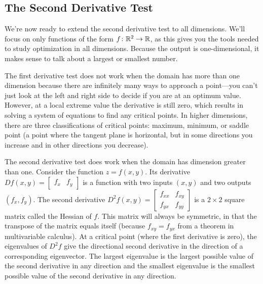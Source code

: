 \subsection{The Second Derivative Test}
We're now ready to extend the second derivative test to all dimensions. We'll focus on only functions of the form $f\colon{\ensuremath{\mathbb{R}}}^2\to{\ensuremath{\mathbb{R}}}$, as this gives you the tools needed to study optimization in all dimensions. Because the output is one-dimensional, it makes sense to talk about a largest or smallest number.

The first derivative test does not work when the domain has more than one dimension because there are infinitely many ways to approach a point---you can't just look at the left and right side to decide if you are at an optimum value. 
However, at a local extreme value the derivative is still zero, which results in solving a system of equations to find any critical points. 
In higher dimensions, there are three classifications of critical points: maximum, minimum, or saddle point (a point where the tangent plane is horizontal, but in some directions you increase and in other directions you decrease). 

The second derivative test does work when the domain has dimension greater than one. Consider the function $z=f(x,y)$. 
Its derivative $Df(x,y) = \begin{bmatrix}f_x&f_y\end{bmatrix}$ is a function with two inputs $(x,y)$ and two outputs $(f_x,f_y)$. 
The second derivative {$D^2f (x,y)= \begin{bmatrix}f_{xx}&f_{xy}\\f_{yx}&f_{yy}\end{bmatrix} $} is a {$2\times 2$} square matrix called the Hessian of $f$. 
This matrix will always be symmetric, in that the transpose of the matrix equals itself (because $f_{xy}=f_{yx}$ from a theorem in multivariable calculus).  
At a critical point (where the first derivative is zero), the eigenvalues of $D^2f$ give the directional second derivative in the direction of a corresponding eigenvector. 
The largest eigenvalue is the largest possible value of the second derivative in any direction and the smallest eigenvalue is the smallest possible value of the second derivative in any direction. 

